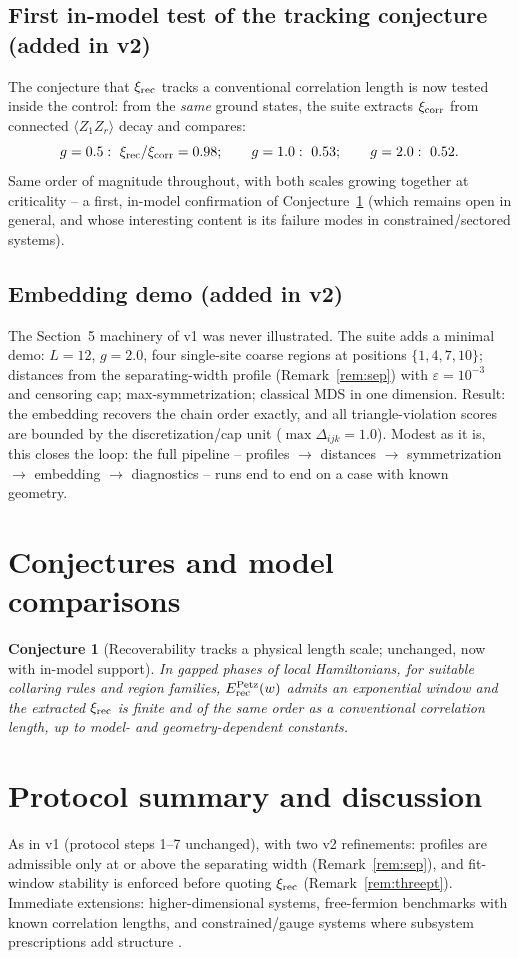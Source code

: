 \documentclass[11pt]{article}
\newtheorem{conjecture}[definition]{Conjecture}
\theoremstyle{remark}
\newcommand{\Erec}{E^{\rm Petz}_{\rm rec}}
\begin{document}
\subsection{First in-model test of the tracking conjecture (added in
v2)}
The conjecture that $\xi_{\rm rec}$ tracks a conventional correlation
length is now tested inside the control: from the \emph{same} ground
states, the suite extracts $\xi_{\rm corr}$ from connected
$\langle Z_1 Z_r \rangle$ decay and compares:
\[
g = 0.5:\ \xi_{\rm rec}/\xi_{\rm corr} = 0.98; \qquad
g = 1.0:\ 0.53; \qquad
g = 2.0:\ 0.52 .
\]
Same order of magnitude throughout, with both scales growing together at
criticality -- a first, in-model confirmation of
Conjecture~\ref{conj:track} (which remains open in general, and whose
interesting content is its failure modes in constrained/sectored
systems).

\subsection{Embedding demo (added in v2)}
The Section~5 machinery of v1 was never illustrated. The suite adds a
minimal demo: $L = 12$, $g = 2.0$, four single-site coarse regions at
positions $\{1, 4, 7, 10\}$; distances from the separating-width profile
(Remark~\ref{rem:sep}) with $\varepsilon = 10^{-3}$ and censoring cap;
max-symmetrization; classical MDS in one dimension. Result: the
embedding recovers the chain order exactly, and all triangle-violation
scores are bounded by the discretization/cap unit ($\max \Delta_{ijk} =
1.0$). Modest as it is, this closes the loop: the full pipeline --
profiles $\to$ distances $\to$ symmetrization $\to$ embedding $\to$
diagnostics -- runs end to end on a case with known geometry.

\section{Conjectures and model comparisons}
\begin{conjecture}[Recoverability tracks a physical length scale;
unchanged, now with in-model support]
\label{conj:track}
In gapped phases of local Hamiltonians, for suitable collaring rules and
region families, $\Erec(w)$ admits an exponential window and the
extracted $\xi_{\rm rec}$ is finite and of the same order as a
conventional correlation length, up to model- and geometry-dependent
constants.
\end{conjecture}

\section{Protocol summary and discussion}
As in v1 (protocol steps 1--7 unchanged), with two v2 refinements:
profiles are admissible only at or above the separating width
(Remark~\ref{rem:sep}), and fit-window stability is enforced before
quoting $\xi_{\rm rec}$ (Remark~\ref{rem:threept}). Immediate
extensions: higher-dimensional systems, free-fermion benchmarks with
known correlation lengths, and constrained/gauge systems where
subsystem prescriptions add structure \cite{ForthGauge}.
\end{document}
